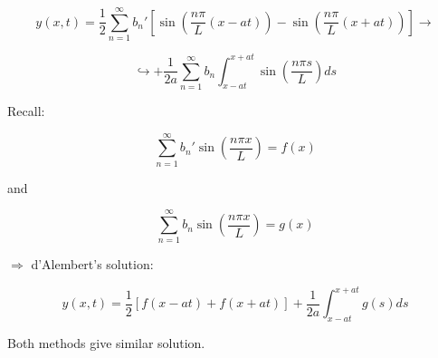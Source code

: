 \documentclass{article}
\begin{document}
$$y(x,t) = \frac{1}{2} \sum_{n = 1}^\infty b_n' \left[ \sin \left( \frac{n \pi}{L} (x-at) \right) - \sin \left( \frac{n \pi}{L} (x+at) \right) \right] \rightarrow$$

$$ \hookrightarrow + \frac{1}{2a} \sum_{n = 1}^\infty b_n \int_{x - at}^{x+at} \sin \left( \frac{n \pi s}{L} \right) ds$$

Recall: 

$$\sum_{n = 1}^\infty b_n' \sin(\frac{n \pi x}{L}) = f(x)$$

and

$$\sum_{n  =1}^\infty b_n \sin \left( \frac{n \pi x}{L} \right) = g(x)$$

$\Rightarrow$ d'Alembert's solution:

$$y(x,t) = \frac{1}{2} \left[ f(x-at) + f(x+at) \right] + \frac{1}{2a} \int_{x-at}^{x+at} g(s) ds$$

Both methods give similar solution. 
\end{document}
